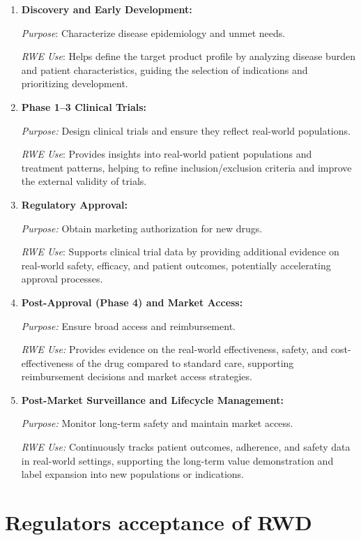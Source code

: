 \documentclass[
]{book}
\begin{document}
\begin{enumerate}
\def\labelenumi{\arabic{enumi}.}
\item
  \textbf{Discovery and Early Development:}

  \emph{Purpose}: Characterize disease epidemiology and unmet needs.

  \emph{RWE Use}: Helps define the target product profile by analyzing
  disease burden and patient characteristics, guiding the selection of
  indications and prioritizing development.
\item
  \textbf{Phase 1--3 Clinical Trials:}

  \emph{Purpose:} Design clinical trials and ensure they reflect
  real-world populations.

  \emph{RWE Use}: Provides insights into real-world patient populations
  and treatment patterns, helping to refine inclusion/exclusion criteria
  and improve the external validity of trials.
\item
  \textbf{Regulatory Approval:}

  \emph{Purpose:} Obtain marketing authorization for new drugs.

  \emph{RWE Use}: Supports clinical trial data by providing additional
  evidence on real-world safety, efficacy, and patient outcomes,
  potentially accelerating approval processes.
\item
  \textbf{Post-Approval (Phase 4) and Market Access:}

  \emph{Purpose:} Ensure broad access and reimbursement.

  \emph{RWE Use:} Provides evidence on the real-world effectiveness,
  safety, and cost-effectiveness of the drug compared to standard care,
  supporting reimbursement decisions and market access strategies.
\item
  \textbf{Post-Market Surveillance and Lifecycle Management:}

  \emph{Purpose:} Monitor long-term safety and maintain market access.

  \emph{RWE Use:} Continuously tracks patient outcomes, adherence, and
  safety data in real-world settings, supporting the long-term value
  demonstration and label expansion into new populations or indications.
\end{enumerate}

\section{Regulators acceptance of
RWD}\label{regulators-acceptance-of-rwd}
\end{document}
